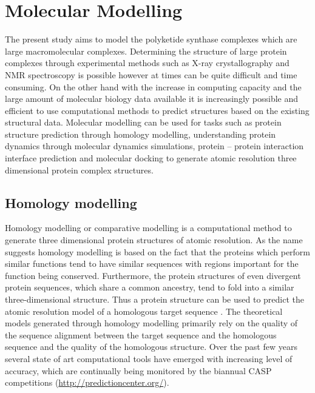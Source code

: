 	\section{Molecular Modelling}
	\label{sec:MolecularModelling}
	The present study aims to model the polyketide synthase complexes which are large macromolecular complexes. Determining the structure of large protein complexes through experimental methods such as X-ray crystallography and NMR  spectroscopy is possible however at times can be quite difficult and time consuming. On the other hand with the increase in computing capacity and the large amount of molecular biology data available it is increasingly possible and efficient to use computational methods to predict structures based on the existing structural data. Molecular modelling can be used for tasks such as protein structure prediction through homology modelling, understanding protein dynamics through molecular dynamics simulations, protein – protein interaction interface prediction and molecular docking to generate atomic resolution three dimensional protein complex structures. 
	
		\subsection{Homology modelling}
		\label{sec:HomologyModelling}
		Homology modelling or comparative modelling is a computational method to generate three dimensional protein structures of atomic resolution. As the name suggests homology modelling is based on the fact that the proteins which perform similar functions tend to have similar sequences with regions important for the function being conserved. Furthermore, the protein structures of even divergent protein sequences, which share a common ancestry, tend to fold into a similar three-dimensional structure. Thus a protein structure can be used to predict the atomic resolution model of a homologous target sequence \Parencite{Chothial1986}. The theoretical models generated through homology modelling primarily rely on the quality of the sequence alignment between the target sequence and the homologous sequence and the quality of the homologous structure. Over the past few years several state of art computational tools have emerged with increasing level of accuracy, which are continually being monitored by the biannual CASP competitions (\url{http://predictioncenter.org/}).
		
